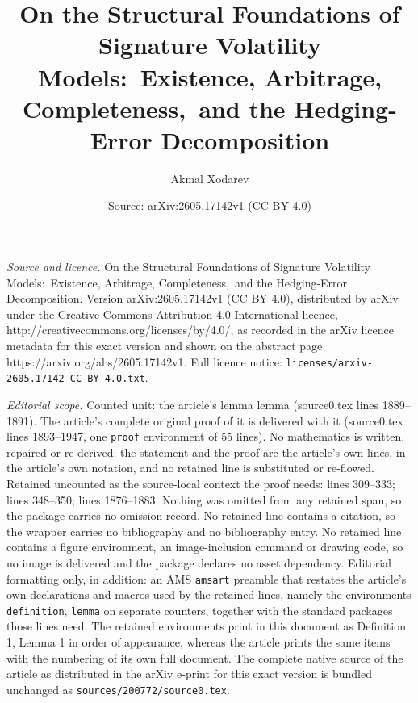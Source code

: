 \documentclass[10pt,a4paper]{amsart}
\title{On the Structural Foundations of Signature Volatility Models:\ Existence, Arbitrage, Completeness,\ and the Hedging-Error Decomposition}
\author{Akmal Xodarev}
\date{Source: arXiv:2605.17142v1 (CC BY 4.0)}
\begin{document}
\maketitle

\noindent\emph{Source and licence.} On the Structural Foundations of Signature Volatility Models:\ Existence, Arbitrage, Completeness,\ and the Hedging-Error Decomposition. Version arXiv:2605.17142v1 (CC BY 4.0), distributed by arXiv under the Creative Commons Attribution 4.0 International licence, http://creativecommons.org/licenses/by/4.0/, as recorded in the arXiv licence metadata for this exact version and shown on the abstract page https://arxiv.org/abs/2605.17142v1. Full licence notice: \texttt{licenses/arxiv-2605.17142-CC-BY-4.0.txt}.\par\smallskip

\noindent\textit{Editorial scope.} Counted unit: the article's lemma lemma (source0.tex lines 1889--1891). The article's complete original proof of it is delivered with it (source0.tex lines 1893--1947, one \texttt{proof} environment of 55 lines). No mathematics is written, repaired or re-derived: the statement and the proof are the article's own lines, in the article's own notation, and no retained line is substituted or re-flowed.  Retained uncounted as the source-local context the proof needs: lines 309--333; lines 348--350; lines 1876--1883.  Nothing was omitted from any retained span, so the package carries no omission record.  No retained line contains a citation, so the wrapper carries no bibliography and no bibliography entry.  No retained line contains a figure environment, an image-inclusion command or drawing code, so no image is delivered and the package declares no asset dependency.  Editorial formatting only, in addition: an AMS \texttt{amsart} preamble that restates the article's own declarations and macros used by the retained lines, namely the environments \texttt{definition}, \texttt{lemma} on separate counters, together with the standard packages those lines need.  The retained environments print in this document as Definition 1, Lemma 1 in order of appearance, whereas the article prints the same items with the numbering of its own full document.  The complete native source of the article as distributed in the arXiv e-print for this exact version is bundled unchanged as \texttt{sources/200772/source0.tex}.
\end{document}

